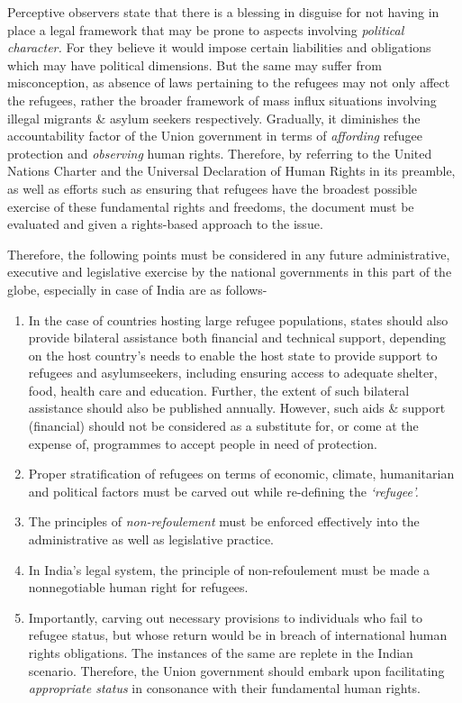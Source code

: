 \begin{multicols}{2}
\noi
Perceptive observers state that there is a blessing in disguise for not having in place a legal
framework that may be prone to aspects involving \textit{political character.} For they believe it
would impose certain liabilities and obligations which may have political dimensions. But the
same may suffer from misconception, as absence of laws pertaining to the refugees may not
only affect the refugees, rather the broader framework of mass influx situations involving
illegal migrants \& asylum seekers respectively. Gradually, it diminishes the accountability
factor of the Union government in terms of \textit{affording} refugee protection and \textit{observing} human rights. Therefore, by referring to the United Nations Charter and the Universal Declaration of
Human Rights in its preamble, as well as efforts such as ensuring that refugees have the
broadest possible exercise of these fundamental rights and freedoms, the document must be
evaluated and given a rights-based approach to the issue.


\noi
Therefore, the following points must be considered in any future administrative, executive
and legislative exercise by the national governments in this part of the globe, especially in
case of India are as follows-

\begin{enumerate}[label=$\bullet$]
\item In the case of countries hosting large refugee populations, states should also provide
bilateral assistance both financial and technical support, depending on the host
country’s needs to enable the host state to provide support to refugees and asylumseekers, including ensuring access to adequate shelter, food, health care and education.
Further, the extent of such bilateral assistance should also be published annually.
However, such aids \& support (financial) should not be considered as a substitute for,
or come at the expense of, programmes to accept people in need of protection.

\item Proper stratification of refugees on terms of economic, climate, humanitarian and
political factors must be carved out while re-defining the \textit{‘refugee’.}

\item The principles of \textit{non-refoulement} must be enforced effectively into the administrative
as well as legislative practice.

\item In India's legal system, the principle of non-refoulement must be made a nonnegotiable human right for refugees.

\item Importantly, carving out necessary provisions to individuals who fail to refugee status,
but whose return would be in breach of international human rights obligations. The
instances of the same are replete in the Indian scenario. Therefore, the Union
government should embark upon facilitating \textit{appropriate status} in consonance with
their fundamental human rights.
\end{enumerate}

\end{multicols}
